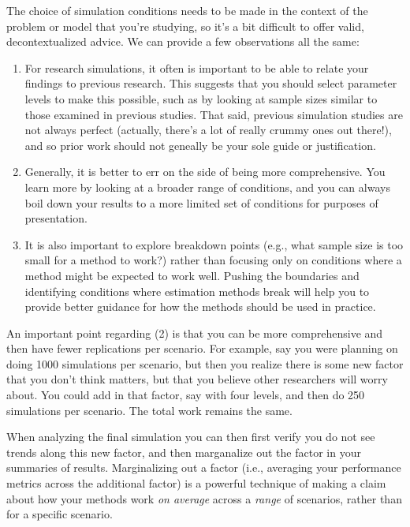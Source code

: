\documentclass[
]{book}
\begin{document}
The choice of simulation conditions needs to be made in the context of the problem or model that you're studying, so it's a bit difficult to offer valid, decontextualized advice.
We can provide a few observations all the same:

\begin{enumerate}
\def\labelenumi{\arabic{enumi}.}
\item
  For research simulations, it often is important to be able to relate your findings to previous research. This suggests that you should select parameter levels to make this possible, such as by looking at sample sizes similar to those examined in previous studies. That said, previous simulation studies are not always perfect (actually, there's a lot of really crummy ones out there!), and so prior work should not geneally be your sole guide or justification.
\item
  Generally, it is better to err on the side of being more comprehensive. You learn more by looking at a broader range of conditions, and you can always boil down your results to a more limited set of conditions for purposes of presentation.
\item
  It is also important to explore breakdown points (e.g., what sample size is too small for a method to work?) rather than focusing only on conditions where a method might be expected to work well. Pushing the boundaries and identifying conditions where estimation methods break will help you to provide better guidance for how the methods should be used in practice.
\end{enumerate}

An important point regarding (2) is that you can be more comprehensive and then have fewer replications per scenario.
For example, say you were planning on doing 1000 simulations per scenario, but then you realize there is some new factor that you don't think matters, but that you believe other researchers will worry about.
You could add in that factor, say with four levels, and then do 250 simulations per scenario.
The total work remains the same.

When analyzing the final simulation you can then first verify you do not see trends along this new factor, and then marganalize out the factor in your summaries of results.
Marginalizing out a factor (i.e., averaging your performance metrics across the additional factor) is a powerful technique of making a claim about how your methods work \emph{on average} across a \emph{range} of scenarios, rather than for a specific scenario.
\end{document}

